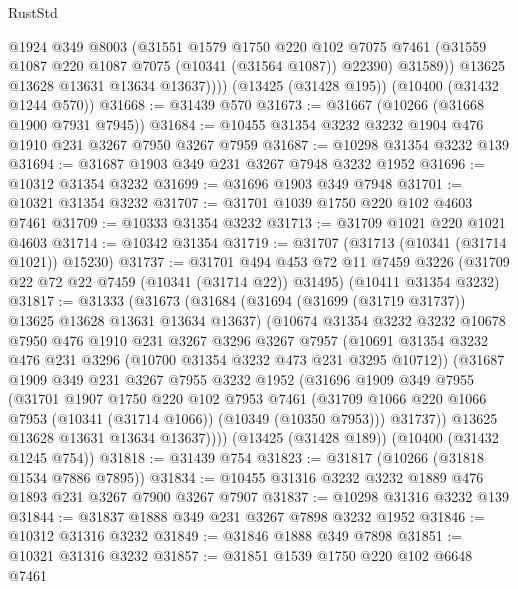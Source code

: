 \begin{lexlean}{RustStd}
\begin{coremodule}
{\begin{coremodule}
{{{{{{{{{{{{{{{{{{{{{{{{{              @1924
              @349
              @8003
              (@31551
                @1579
                @1750
                @220
                @102
                @7075
                @7461
                (@31559 @1087 @220 @1087 @7075 (@10341 (@31564 @1087)) @22390)
                @31589))
            @13625
            @13628
            @13631
            @13634
            @13637))))
    (@13425 (@31428 @195))
    (@10400 (@31432 @1244 @570))
@31668 := @31439 @570
@31673 := @31667 (@10266 (@31668 @1900 @7931 @7945))
@31684 := @10455 @31354 @3232 @3232 @1904 @476 @1910 @231 @3267 @7950 @3267 @7959
@31687 := @10298 @31354 @3232 @139
@31694 := @31687 @1903 @349 @231 @3267 @7948 @3232 @1952
@31696 := @10312 @31354 @3232
@31699 := @31696 @1903 @349 @7948
@31701 := @10321 @31354 @3232
@31707 := @31701 @1039 @1750 @220 @102 @4603 @7461
@31709 := @10333 @31354 @3232
@31713 := @31709 @1021 @220 @1021 @4603
@31714 := @10342 @31354
@31719 := @31707 (@31713 (@10341 (@31714 @1021)) @15230)
@31737 := @31701
    @494
    @453
    @72
    @11
    @7459
    @3226
    (@31709 @22 @72 @22 @7459 (@10341 (@31714 @22)) @31495)
    (@10411 @31354 @3232)
@31817 := @31333
    (@31673
      (@31684
        (@31694 (@31699 (@31719 @31737)) @13625 @13628 @13631 @13634 @13637)
        (@10674
          @31354
          @3232
          @3232
          @10678
          @7950
          @476
          @1910
          @231
          @3267
          @3296
          @3267
          @7957
          (@10691 @31354 @3232 @476 @231 @3296 (@10700 @31354 @3232 @473 @231 @3295 @10712))
          (@31687
            @1909
            @349
            @231
            @3267
            @7955
            @3232
            @1952
            (@31696
              @1909
              @349
              @7955
              (@31701
                @1907
                @1750
                @220
                @102
                @7953
                @7461
                (@31709 @1066 @220 @1066 @7953 (@10341 (@31714 @1066)) (@10349 (@10350 @7953)))
                @31737))
            @13625
            @13628
            @13631
            @13634
            @13637))))
    (@13425 (@31428 @189))
    (@10400 (@31432 @1245 @754))
@31818 := @31439 @754
@31823 := @31817 (@10266 (@31818 @1534 @7886 @7895))
@31834 := @10455 @31316 @3232 @3232 @1889 @476 @1893 @231 @3267 @7900 @3267 @7907
@31837 := @10298 @31316 @3232 @139
@31844 := @31837 @1888 @349 @231 @3267 @7898 @3232 @1952
@31846 := @10312 @31316 @3232
@31849 := @31846 @1888 @349 @7898
@31851 := @10321 @31316 @3232
@31857 := @31851 @1539 @1750 @220 @102 @6648 @7461
}}}}}}}}}}}}}}}}}}}}}}}}}
\end{coremodule}}
\end{coremodule}
\end{lexlean}
